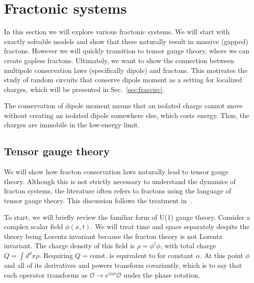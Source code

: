 \documentclass[a4paper,12pt]{article}
\newcommand{\note}[1]{{\color{red}{#1}}}
\begin{document}
\note{ballistic front,
	a power-law tail behind the front, and diffusively spread-
	ing charges near the origin}


\section{Fractonic systems} \label{sec:frac}

In this section we will explore various fractonic systems. We will start with exactly solvable models and show that these naturally result in massive (gapped) fractons. However we will quickly transition to tensor gauge theory, where we can create gapless fractons. Ultimately, we want to show the connection between multipole conservation laws (specifically dipole) and fractons. This motivates the study of random circuits that conserve dipole moment as a setting for localized charges, which will be presented in Sec.~\ref{sec:fraccirc}.

The conservation of dipole moment means that an isolated charge cannot move without creating an isolated dipole somewhere else, which costs energy. Thus, the charges are immobile in the low-energy limit. 

\subsection{Tensor gauge theory} \label{sub:tensor}

We will show how fracton conservation laws naturally lead to tensor gauge theory. Although this is not strictly necessary to understand the dynamics of fracton systems, the literature often refers to fractons using the language of tensor gauge theory. This discussion follows the treatment in~\cite{PretkoFractonGauge}. 

To start, we will briefly review the familiar form of U(1) gauge theory. Consider a complex scalar field $\phi(x,t)$. We will treat time and space separately despite the theory being Lorentz invariant because the fracton theory is not Lorentz invariant. The charge density of this field is $\rho =\phi^\dag\phi$, with total charge $Q=\int d^dx \rho$. Requiring $Q=\text{const.}$ is equivalent to \note{requiring
\begin{align}
\phi\to e^{i\alpha}\phi
\end{align}	
be a symmetry of the theory,} for constant $\alpha$. At this point $\phi$ and all of its derivatives and powers transform covariantly, which is to say that each operator transforms as $\mathcal{O}\to e^{in\alpha}\mathcal{O}$ under the phase rotation.
\end{document}
